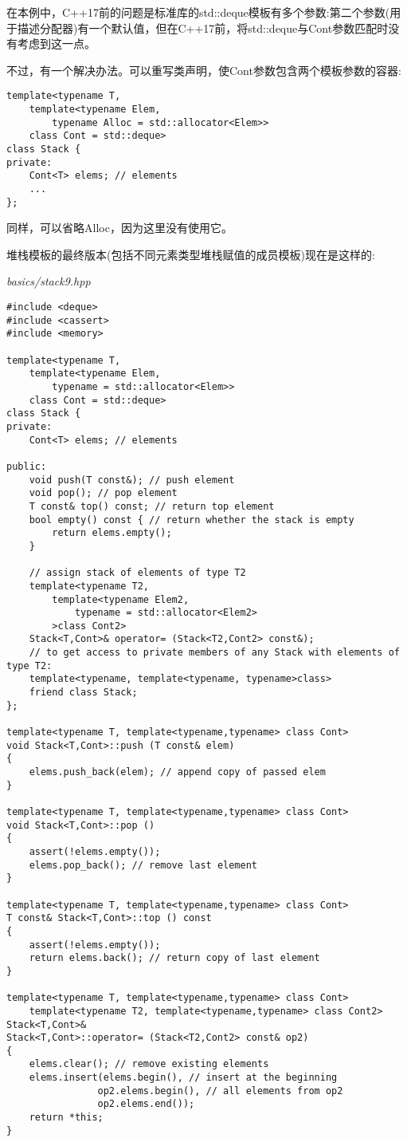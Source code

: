 在本例中，C++17前的问题是标准库的std::deque模板有多个参数:第二个参数(用于描述分配器)有一个默认值，但在C++17前，将std::deque与Cont参数匹配时没有考虑到这一点。

不过，有一个解决办法。可以重写类声明，使Cont参数包含两个模板参数的容器:

\begin{lstlisting}[style=styleCXX]
template<typename T,
	template<typename Elem,
		typename Alloc = std::allocator<Elem>>
	class Cont = std::deque>
class Stack {
private:
	Cont<T> elems; // elements
	...
};
\end{lstlisting}

同样，可以省略Alloc，因为这里没有使用它。

堆栈模板的最终版本(包括不同元素类型堆栈赋值的成员模板)现在是这样的:

\noindent
\textit{basics/stack9.hpp}
\begin{lstlisting}[style=styleCXX]
#include <deque>
#include <cassert>
#include <memory>

template<typename T,
	template<typename Elem,
		typename = std::allocator<Elem>>
	class Cont = std::deque>
class Stack {
private:
	Cont<T> elems; // elements
	
public:
	void push(T const&); // push element
	void pop(); // pop element
	T const& top() const; // return top element
	bool empty() const { // return whether the stack is empty
		return elems.empty();
	}

	// assign stack of elements of type T2
	template<typename T2,
		template<typename Elem2,
			typename = std::allocator<Elem2>
		>class Cont2>
	Stack<T,Cont>& operator= (Stack<T2,Cont2> const&);
	// to get access to private members of any Stack with elements of type T2:
	template<typename, template<typename, typename>class>
	friend class Stack;
};

template<typename T, template<typename,typename> class Cont>
void Stack<T,Cont>::push (T const& elem)
{
	elems.push_back(elem); // append copy of passed elem
}

template<typename T, template<typename,typename> class Cont>
void Stack<T,Cont>::pop ()
{
	assert(!elems.empty());
	elems.pop_back(); // remove last element
}

template<typename T, template<typename,typename> class Cont>
T const& Stack<T,Cont>::top () const
{
	assert(!elems.empty());
	return elems.back(); // return copy of last element
}

template<typename T, template<typename,typename> class Cont>
	template<typename T2, template<typename,typename> class Cont2>
Stack<T,Cont>&
Stack<T,Cont>::operator= (Stack<T2,Cont2> const& op2)
{
	elems.clear(); // remove existing elements
	elems.insert(elems.begin(), // insert at the beginning
				op2.elems.begin(), // all elements from op2
				op2.elems.end());
	return *this;
}
\end{lstlisting}

